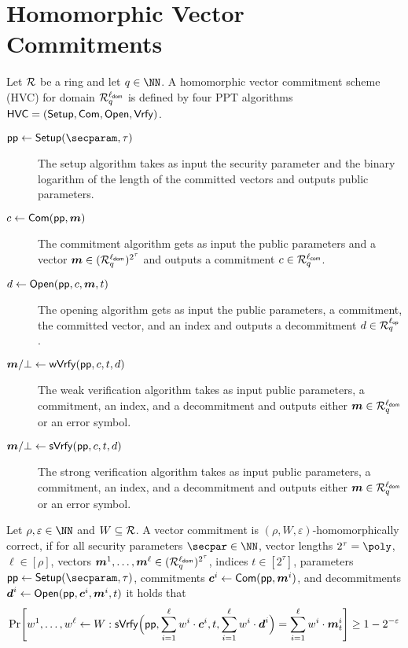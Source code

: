 \section{Homomorphic Vector Commitments}\label{sec:veccom}

\begin{definition}\label{def:hvc}
  Let $\mathcal{R}$ be a ring and let $q\in\NN$.
  A homomorphic vector commitment scheme (HVC) for domain $\mathcal{R}^{\ell_{\mathsf{dom}}}_q$ is defined by four PPT algorithms $\mathsf{HVC}=(\mathsf{Setup},\mathsf{Com},\allowbreak\mathsf{Open},\mathsf{Vrfy})$.
\begin{description}
    \item[$\params\gets\setup(\secparam,\tau)$] The setup algorithm takes as input the security parameter and the binary logarithm of the length of the committed vectors and outputs public parameters.
    \item[$c \gets \mathsf{Com}(\mathsf{pp},\boldsymbol{m})$] The commitment algorithm gets as input the public parameters and a vector $\boldsymbol{m}\in(\mathcal{R}_q^{\ell_{\mathsf{dom}}})^{2^\tau}$ and outputs a commitment $c\in\mathcal{R}_q^{\ell_{\mathsf{com}}}$.
    \item[$d \gets \mathsf{Open}(\mathsf{pp},c,\boldsymbol{m},t)$] The opening algorithm gets as input the public parameters, a commitment, the committed vector, and an index and outputs a decommitment $d\in\mathcal{R}_q^{{\ell_{\mathsf{op}}}}$.
    \item[$\boldsymbol{m}/\bot\gets \mathsf{wVrfy}(\mathsf{pp},c,t,d)$] The weak verification algorithm takes as input public parameters, a commitment, an index, and a decommitment and outputs either $\boldsymbol{m}\in\mathcal{R}^{\ell_{\mathsf{dom}}}_q$ or an error symbol.
    \item[$\boldsymbol{m}/\bot\gets \mathsf{sVrfy}(\mathsf{pp},c,t,d)$] The strong verification algorithm takes as input public parameters, a commitment, an index, and a decommitment and outputs either $\boldsymbol{m}\in\mathcal{R}^{\ell_{\mathsf{dom}}}_q$ or an error symbol.
  \end{description}
  Let $\rho,\varepsilon\in\NN$ and $W\subseteq\mathcal{R}$.
  A vector commitment is $(\rho,W,\varepsilon)$-homomorphically correct, if for all security parameters $\secpar\in\NN$, vector lengths $2^\tau=\poly$, $\ell\in[\rho]$, vectors $\boldsymbol{m}^1,\dots,\boldsymbol{m}^{\ell}\in(\mathcal{R}_q^{\ell_{\mathsf{dom}}})^{2^\tau}$, indices $t\in[2^\tau]$, parameters $\params \gets \setup(\secparam,\tau)$, commitments $\boldsymbol{c}^i \gets \mathsf{Com}(\mathsf{pp},\boldsymbol{m}^i)$, and decommitments $\boldsymbol{d}^i \gets \mathsf{Open}(\mathsf{pp},\boldsymbol{c}^i,\boldsymbol{m}^i,t)$ it holds that
  \[
    \Pr\mleft[
      w^1,\dots,w^{\ell} \gets W :
      \sverify\Bigl(\params,\sum_{i=1}^{\ell}w^i\cdot \vec{c}^i,t,\sum_{i=1}^{\ell}w^i\cdot \vec{d}^i\Bigr) = \sum_{i=1}^{\ell}w^i\cdot\vec{m}^i_{t}
    \mright] \geq 1-2^{-\varepsilon}
  \]
\end{definition}

